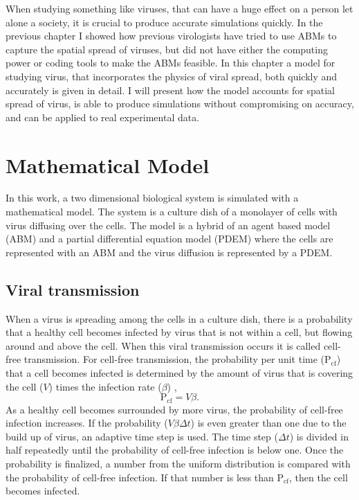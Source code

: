 When studying something like viruses, that can have a huge effect on a person let alone a society, it is crucial to produce accurate simulations quickly. In the previous chapter I showed how previous virologists have tried to use ABMs to capture the spatial spread of viruses, but did not have either the computing power or coding tools to make the ABMs feasible. In this chapter a model for studying virus, that incorporates the physics of viral spread, both quickly and accurately is given in detail. I will present how the model accounts for spatial spread of virus, is able to produce simulations without compromising on accuracy, and can be applied to real experimental data.

\section{Mathematical Model}

In this work, a two dimensional biological system is simulated with a mathematical model. The system is a culture dish of a monolayer of cells with virus diffusing over the cells. The model is a hybrid of an agent based model (ABM) and a partial differential equation model (PDEM) where the cells are represented with an ABM and the virus diffusion is represented by a PDEM.

\subsection{Viral transmission} \label{Viral_transmission}

When a virus is spreading among the cells in a culture dish, there is a probability that a healthy cell becomes infected by virus that is not within a cell, but flowing around and above the cell. When this viral transmission occurs it is called cell-free transmission. For cell-free transmission, the probability per unit time ($\mathrm{P_{cf}}$) that a cell becomes infected is determined by the amount of virus that is covering the cell ($V$) times the infection rate ($\beta$) \citep{holder11autoimm}, 
$$\mathrm{P_{cf}} = V \beta.$$ 
As a healthy cell becomes surrounded by more virus, the probability of cell-free infection increases. If the probability ($V \beta \Delta t$) is even greater than one due to the build up of virus, an adaptive time step is used. The time step ($\Delta t$) is divided in half repeatedly until the probability of cell-free infection is below one. Once the probability is finalized, a number from the uniform distribution is compared with the probability of cell-free infection. If that number is less than $\mathrm{P_{cf}}$, then the cell becomes infected.


